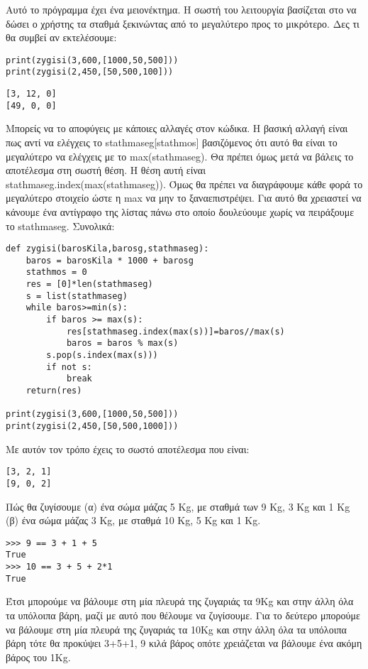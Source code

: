 Αυτό το πρόγραμμα έχει ένα μειονέκτημα. Η σωστή του λειτουργία βασίζεται στο να δώσει ο χρήστης τα σταθμά ξεκινώντας από το μεγαλύτερο προς το μικρότερο. Δες τι θα συμβεί αν εκτελέσουμε:
\begin{lstlisting}
print(zygisi(3,600,[1000,50,500]))
print(zygisi(2,450,[50,500,100]))
\end{lstlisting}
\begin{lstlisting}
[3, 12, 0]
[49, 0, 0]
\end{lstlisting}
Μπορείς να το αποφύγεις με κάποιες αλλαγές στον κώδικα. Η βασική αλλαγή είναι πως αντί να ελέγχεις το stathmaseg[stathmos] βασιζόμενος ότι αυτό θα είναι το μεγαλύτερο να ελέγχεις με το max(stathmaseg). Θα πρέπει όμως μετά να βάλεις το αποτέλεσμα στη σωστή θέση. Η θέση αυτή είναι stathmaseg.index(max(stathmaseg)). Όμως θα πρέπει να διαγράφουμε κάθε φορά το μεγαλύτερο στοιχείο ώστε η max να μην το ξαναεπιστρέψει. Για αυτό θα χρειαστεί να κάνουμε ένα αντίγραφο της λίστας πάνω στο οποίο δουλεύουμε χωρίς να πειράξουμε το stathmaseg. Συνολικά:
\begin{lstlisting}
def zygisi(barosKila,barosg,stathmaseg):
    baros = barosKila * 1000 + barosg
    stathmos = 0
    res = [0]*len(stathmaseg)
    s = list(stathmaseg)
    while baros>=min(s):
        if baros >= max(s):
            res[stathmaseg.index(max(s))]=baros//max(s)
            baros = baros % max(s)
        s.pop(s.index(max(s)))
        if not s:
            break
    return(res)

print(zygisi(3,600,[1000,50,500]))
print(zygisi(2,450,[50,500,1000]))
\end{lstlisting}
Με αυτόν τον τρόπο έχεις το σωστό αποτέλεσμα που είναι:
\begin{lstlisting}
[3, 2, 1]
[9, 0, 2]
\end{lstlisting}
\begin{exercise}
Πώς θα ζυγίσουμε (α) ένα σώμα μάζας 5 Κg, με σταθμά των 9 Κg, 3 Κg και 1 Κg (β) ένα σώμα μάζας 3 Κg, με σταθμά 10 Κg, 5 Κg και 1 Κg. 
\end{exercise}
\begin{lstlisting}
>>> 9 == 3 + 1 + 5
True
>>> 10 == 3 + 5 + 2*1
True
\end{lstlisting}
Έτσι μπορούμε να βάλουμε στη μία πλευρά της ζυγαριάς τα 9Kg και στην άλλη όλα τα υπόλοιπα βάρη, μαζί με αυτό που θέλουμε να ζυγίσουμε.
Για το δεύτερο μπορούμε να βάλουμε στη μία πλευρά της ζυγαριάς τα 10Kg και στην άλλη όλα τα υπόλοιπα βάρη τότε θα προκύψει 3+5+1, 9 κιλά βάρος οπότε χρειάζεται να βάλουμε ένα ακόμη βάρος του 1Kg.
